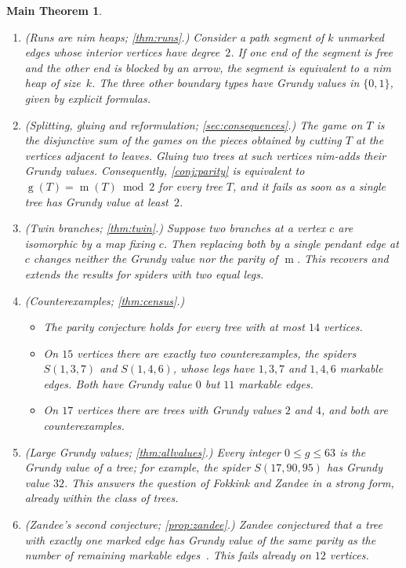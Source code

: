 \documentclass[11pt]{amsart}
\newtheorem*{mainthm}{Main Theorem}
\theoremstyle{definition}
\theoremstyle{remark}
\newcommand{\gv}{\operatorname{g}}           %
\newcommand{\m}{\operatorname{m}}
\newcommand{\Sp}{S}
\begin{document}
\begin{mainthm}
\leavevmode
\begin{enumerate}[label=\textup{(\Alph*)},leftmargin=*]
\item \textup{(Runs are nim heaps; \cref{thm:runs}.)} Consider a path segment of $k$ unmarked edges whose interior vertices have degree~$2$. If one end of the segment is free and the other end is blocked by an arrow, the segment is equivalent to a nim heap of size~$k$. The three other boundary types have Grundy values in $\{0,1\}$, given by explicit formulas.
\item \textup{(Splitting, gluing and reformulation; \cref{sec:consequences}.)} The game on $T$ is the disjunctive sum of the games on the \emph{pieces} obtained by cutting $T$ at the vertices adjacent to leaves. Gluing two trees at such vertices nim-adds their Grundy values. Consequently, \cref{conj:parity} is equivalent to $\gv(T)=\m(T)\bmod 2$ for every tree $T$, and it fails as soon as a single tree has Grundy value at least~$2$.
\item \textup{(Twin branches; \cref{thm:twin}.)} Suppose two branches at a vertex $c$ are isomorphic by a map fixing $c$. Then replacing both by a single pendant edge at $c$ changes neither the Grundy value nor the parity of $\m$. This recovers and extends the results for spiders with two equal legs.
\item \textup{(Counterexamples; \cref{thm:census}.)}
\begin{itemize}[leftmargin=*]
\item The parity conjecture holds for every tree with at most $14$ vertices.
\item On $15$ vertices there are exactly two counterexamples, the spiders $\Sp(1,3,7)$ and $\Sp(1,4,6)$, whose legs have $1,3,7$ and $1,4,6$ markable edges. Both have Grundy value $0$ but $11$ markable edges.
\item On $17$ vertices there are trees with Grundy values $2$ and $4$, and both are counterexamples.
\end{itemize}
\item \textup{(Large Grundy values; \cref{thm:allvalues}.)} Every integer $0\le g\le 63$ is the Grundy value of a tree; for example, the spider $\Sp(17,90,95)$ has Grundy value $32$. This answers the question of Fokkink and Zandee in a strong form, already within the class of trees.
\item \textup{(Zandee's second conjecture; \cref{prop:zandee}.)} Zandee conjectured that a tree with exactly one marked edge has Grundy value of the same parity as the number of remaining markable edges~\cite[Conjecture~4.3]{Zandee2022}. This fails already on $12$ vertices.

\end{enumerate}
\end{mainthm}
\end{document}
